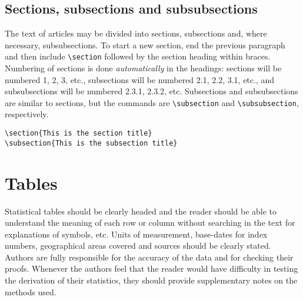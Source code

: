 \documentclass{OUP-EJ}
\begin{document}
\subsection{Sections, subsections and subsubsections}
The text of articles may be divided into sections, subsections and, where necessary,
subsubsections. To start a new section, end the previous paragraph and
then include \verb"\section" followed by the section heading within braces.
Numbering of sections is done {\it automatically} in the headings:
sections will be 	numbered 1, 2, 3, etc., subsections will be numbered
2.1, 2.2,  3.1, etc., and subsubsections will be numbered 2.3.1, 2.3.2,
etc.  Subsections and subsubsections are
similar to sections, but
the commands are \verb"\subsection" and \verb"\subsubsection", respectively.
\small\begin{verbatim}
\section{This is the section title}
\subsection{This is the subsection title}
\end{verbatim}\normalsize

\section{Tables}

Statistical tables should be clearly headed and the reader should be able to understand the
meaning of each row or column without searching in the text for explanations of symbols, etc.
Units of measurement, base-dates for index numbers, geographical areas covered and sources
should be clearly stated. Authors are fully responsible for the accuracy of the data and for
checking their proofs. Whenever the authors feel that the reader would have difficulty in testing
the derivation of their statistics, they should provide supplementary notes on the methods used.
\end{document}
